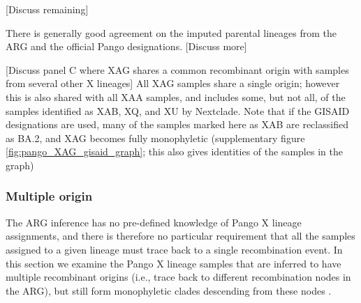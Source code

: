 \documentclass{article}
\begin{document}
[Discuss remaining]

There is generally good agreement on the imputed parental lineages from the ARG and the official Pango designations. [Discuss more]

[Discuss panel C where XAG shares a common recombinant origin with samples from several other X lineages]
All XAG samples share a single origin; however this is also shared with all XAA samples, and includes some, but not all, of the samples identified as XAB, XQ, and XU by Nextclade. Note that if the GISAID designations are used, many of the samples marked here as XAB are reclassified as BA.2, and XAG becomes fully monophyletic (supplementary figure \ref{fig:pango_XAG_gisaid_graph}; this also gives identities of the samples in the graph)

\subsubsection{Multiple origin}
The ARG inference has no pre-defined knowledge of Pango X lineage assignments, and there is therefore no particular requirement that all the samples assigned to a given lineage must trace back to a single recombination event. In this section we examine the Pango X lineage samples that are inferred to have multiple recombinant origins (i.e., trace back to different recombination nodes in the ARG), but still form monophyletic clades %
descending from these nodes .
\end{document}
